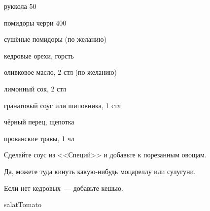 {
\item руккола 50
\item помидоры черри 400
\item сушёные помидоры (по желанию)
\item кедровые орехи, горсть
}{
\item оливковое масло, 2 стл (по желанию)
\item лимонный сок, 2 стл
\item гранатовый соус или шиповника, 1 стл
\item чёрный перец, щепотка
\item прованские травы, 1 чл
}{
Сделайте соус из <<Специй>> и добавьте к порезанным овощам.
}{
\begin{advice}
\item Да, можете туда кинуть какую-нибудь моцареллу или сулугуни.
\item Если нет кедровых~--- добавьте кешью.

\end{advice}}{salatTomato}



